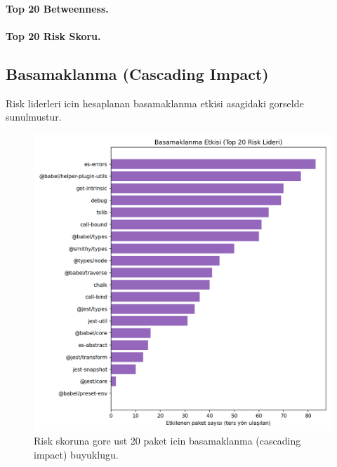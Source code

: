 \documentclass[11pt,a4paper]{article}
\begin{document}
\paragraph{Top 20 Betweenness.}

\paragraph{Top 20 Risk Skoru.}

\subsection{Basamaklanma (Cascading Impact)}
Risk liderleri icin hesaplanan basamaklanma etkisi asagidaki gorselde sunulmustur.
\begin{figure}[h]
  \centering
  \includegraphics[width=0.75\linewidth]{cascade_impact_top20.png}
  \caption{Risk skoruna gore ust 20 paket icin basamaklanma (cascading impact) buyuklugu.}
\end{figure}
\end{document}
